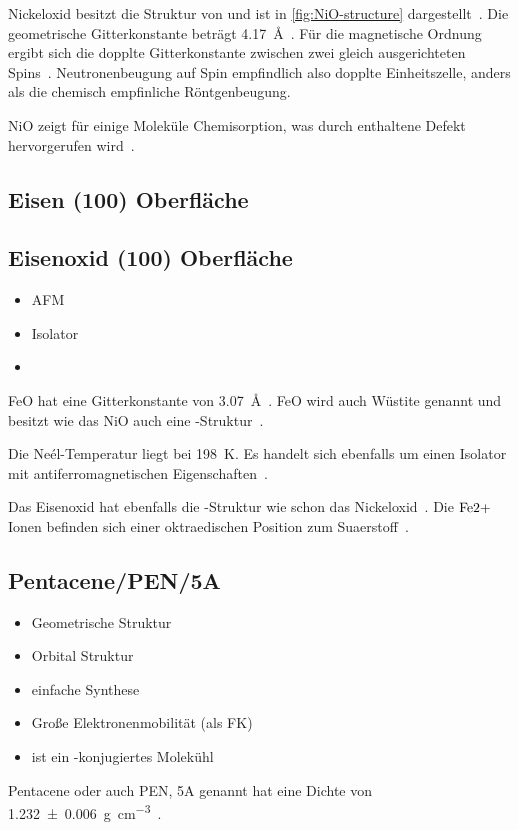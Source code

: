            Nickeloxid besitzt die Struktur von  und ist in \autoref{fig:NiO-structure} dargestellt~\cite{kunz_chemisorption_1985}. 
            Die geometrische Gitterkonstante beträgt \SI{4.17}{\angstrom}~\cite{sebbari_uranyl_2012}.
            Für die magnetische Ordnung ergibt sich die dopplte Gitterkonstante zwischen zwei gleich ausgerichteten Spins~\cite{Suter}.
            Neutronenbeugung auf Spin empfindlich also dopplte Einheitszelle, anders als die chemisch empfinliche Röntgenbeugung.

            NiO zeigt für einige Moleküle Chemisorption, was durch enthaltene Defekt hervorgerufen wird~\cite{kunz_chemisorption_1985}.
        
        \subsection{Eisen (100) Oberfläche}

        \subsection{Eisenoxid (100) Oberfläche}
            \begin{itemize}
                \item AFM
                \item Isolator
                \item 
            \end{itemize}
            FeO hat eine Gitterkonstante von \SI{3.07}{\angstrom}~\cite{FeO_1}.
            FeO wird auch Wüstite genannt und besitzt wie das NiO auch eine -Struktur~\cite{FeO_4}.

            Die Neél-Temperatur liegt bei \SI{198}{\kelvin}.
            Es handelt sich ebenfalls um einen Isolator mit antiferromagnetischen Eigenschaften~\cite{FeO_4}.

            Das Eisenoxid hat ebenfalls die -Struktur wie schon das Nickeloxid~\cite{FeO_4}.
            Die $\ce{Fe{2+}}$ Ionen befinden sich einer oktraedischen Position zum Suaerstoff~\cite{FeO_4}.

        \subsection{Pentacene/PEN/5A}
            \begin{itemize}
                \item Geometrische Struktur
                \item Orbital Struktur
                \item einfache Synthese
                \item Große Elektronenmobilität (als FK)
                \item ist ein \pi-konjugiertes Molekühl \cite{MM_2}
            \end{itemize}
            Pentacene oder auch PEN, 5A genannt hat eine Dichte von \SI{1.232(6)}{\gram\per\cubic\centi\meter}~\cite{CAS}.

